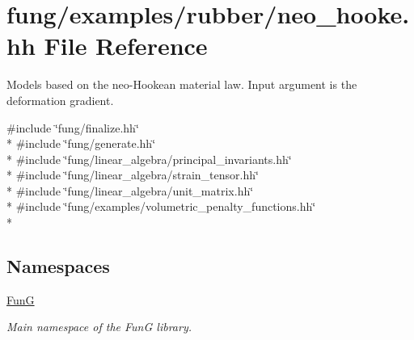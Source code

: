 \hypertarget{neo__hooke_8hh}{}\section{fung/examples/rubber/neo\+\_\+hooke.hh File Reference}
\label{neo__hooke_8hh}


Models based on the neo-\/\+Hookean material law. Input argument is the deformation gradient.  


{\ttfamily \#include \char`\"{}fung/finalize.\+hh\char`\"{}}\\*
{\ttfamily \#include \char`\"{}fung/generate.\+hh\char`\"{}}\\*
{\ttfamily \#include \char`\"{}fung/linear\+\_\+algebra/principal\+\_\+invariants.\+hh\char`\"{}}\\*
{\ttfamily \#include \char`\"{}fung/linear\+\_\+algebra/strain\+\_\+tensor.\+hh\char`\"{}}\\*
{\ttfamily \#include \char`\"{}fung/linear\+\_\+algebra/unit\+\_\+matrix.\+hh\char`\"{}}\\*
{\ttfamily \#include \char`\"{}fung/examples/volumetric\+\_\+penalty\+\_\+functions.\+hh\char`\"{}}\\*
\subsection*{Namespaces}
\begin{DoxyCompactItemize}
\item 
 \hyperlink{namespaceFunG}{Fun\+G}
\begin{DoxyCompactList}\small\item\em Main namespace of the Fun\+G library. \end{DoxyCompactList}\end{DoxyCompactItemize}
